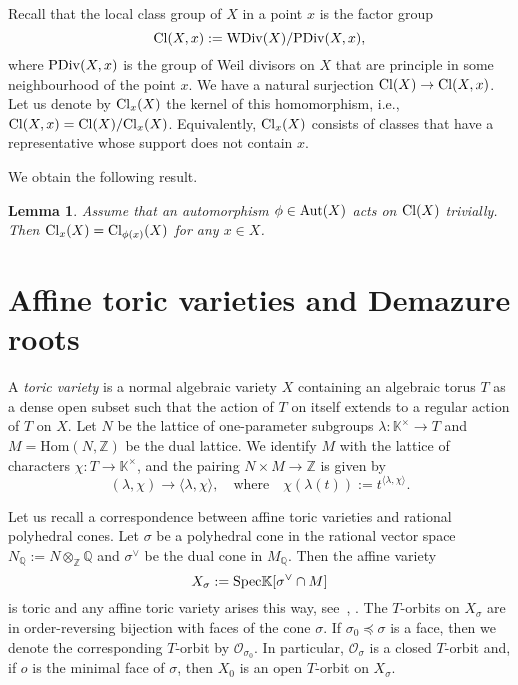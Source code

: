 \documentclass[12pt,a4paper]{amsart}
\theoremstyle{plain}
\newtheorem{lemma}{Lemma}
\theoremstyle{definition}
\begin{document}
Recall that the local class group of $X$ in a point $x$ is the factor group
$$
{\mathop{\rm Cl}}(X,x) := {\mathop{\rm WDiv}}(X) / {\mathop{\rm PDiv}}(X, x),
$$
where ${\mathop{\rm PDiv}}(X,x)$ is the group of Weil divisors on $X$ that are principle in some
neighbourhood of the point $x$. We have a natural surjection ${\mathop{\rm Cl}}(X) \to {\mathop{\rm Cl}}(X,x)$.
Let us denote by ${\mathop{\rm Cl}}_x(X)$ the kernel of this homomorphism, i.e., ${\mathop{\rm Cl}}(X,x)={\mathop{\rm Cl}}(X)/{\mathop{\rm Cl}}_x(X)$.
Equivalently, ${\mathop{\rm Cl}}_x(X)$ consists of classes that have a representative whose support
does not contain $x$.

\smallskip

We obtain the following result.

\begin{lemma} \label{lemlcg}
Assume that an automorphism $\phi\in{\mathop{\rm Aut}}(X)$ acts on ${\mathop{\rm Cl}}(X)$ trivially. Then ${\mathop{\rm Cl}}_x(X)={\mathop{\rm Cl}}_{\phi(x)}(X)$ for any $x\in X$.
\end{lemma}

\section{Affine toric varieties and Demazure roots}
\label{sec2}

A {\it toric variety} is a normal algebraic variety $X$ containing
an algebraic torus $T$ as a dense open subset such that the action
of $T$ on itself extends to a regular action of $T$ on $X$.
Let $N$ be the lattice of one-parameter subgroups $\lambda: {{\mathbb K}}^{\times} \to T$ and
$M=\text{Hom}(N,{{\mathbb Z}})$ be the dual lattice. We identify $M$
with the lattice of characters $\chi: T\to{{\mathbb K}}^{\times}$, and
the pairing $N\times M \to {{\mathbb Z}}$ is given by
$$
(\lambda,\chi) \to
\langle \lambda,\chi\rangle,\quad \text{where} \quad \chi(\lambda(t)):=
t^{\langle \lambda,\chi\rangle}.
$$

Let us recall a correspondence between affine toric varieties and
rational polyhedral cones. Let $\sigma$ be a polyhedral cone in the rational
vector space $N_{{\mathbb Q}}:=N\otimes_{{\mathbb Z}} {{\mathbb Q}}$ and $\sigma^{\vee}$ be the dual cone
in $M_{{\mathbb Q}}$. Then the affine variety
$$
X_{\sigma} := {\mathop{\rm Spec}} {{\mathbb K}}[\sigma^{\vee}\cap M]
$$
is toric and any affine toric variety arises this way, see~\cite{CLS}, \cite{Fu}.
The $T$-orbits on $X_{\sigma}$ are in order-reversing bijection with faces
of the cone $\sigma$.
If $\sigma_0\preceq\sigma$ is a face, then we denote the corresponding $T$-orbit
by ${{\mathcal{O}}}_{\sigma_0}$. In particular, ${{\mathcal{O}}}_{\sigma}$ is
a closed $T$-orbit and, if $o$ is the minimal face of $\sigma$, then
$X_0$ is an open $T$-orbit on $X_{\sigma}$.
\end{document}
